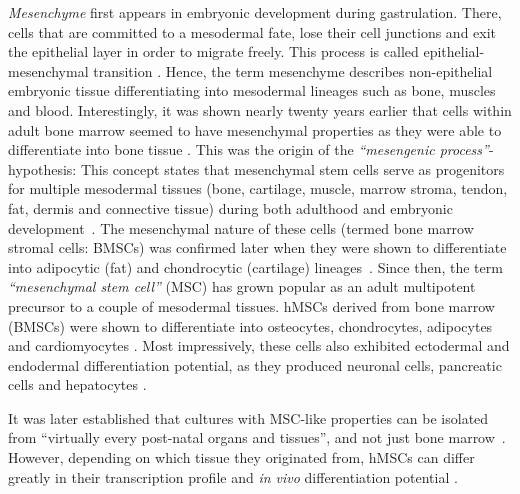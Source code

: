 \emph{Mesenchyme} first appears in embryonic development during gastrulation.
There, cells that are committed to a mesodermal fate, lose their cell junctions
and exit the epithelial layer in order to migrate freely. This process is called
epithelial-mesenchymal transition
\cite{tamFormationMesodermalTissues1987,nowotschinCellularDynamicsEarly2010}.
Hence, the term mesenchyme describes non-epithelial embryonic tissue
differentiating into mesodermal lineages such as bone, muscles and blood.
Interestingly, it was shown nearly twenty years earlier that cells within adult
bone marrow seemed to have mesenchymal properties as they were able to
differentiate into bone tissue
\cite{friedensteinOsteogenesisTransplantsBone1966,
    friedensteinOsteogenicPrecursorCells1971, biancoMesenchymalStemCells2014}. This
was the origin of the \emph{``mesengenic process''}-hypothesis: This concept
states that mesenchymal stem cells serve as progenitors for multiple mesodermal
tissues (bone, cartilage, muscle, marrow stroma, tendon, fat, dermis and
connective tissue) during both adulthood and embryonic
development~\cite{caplanMesenchymalStemCells1991,caplanMesengenicProcess1994}.
The mesenchymal nature of these cells (termed bone marrow stromal cells: BMSCs)
was confirmed later when they were shown to differentiate into adipocytic (fat)
and chondrocytic (cartilage)
lineages~\cite{pittengerMultilineagePotentialAdult1999}. Since then, the term
\emph{``mesenchymal stem cell''} (MSC) has grown popular as an adult multipotent
precursor to a couple of mesodermal tissues. hMSCs derived from bone marrow
(BMSCs) were shown to differentiate into osteocytes, chondrocytes, adipocytes
and cardiomyocytes \cite{gronthosSTRO1FractionAdult1994,
    muruganandanAdipocyteDifferentiationBone2009, xuMesenchymalStemCells2004}. Most
impressively, these cells also exhibited ectodermal and endodermal
differentiation potential, as they produced neuronal cells, pancreatic cells and
hepatocytes \cite{barzilayLentiviralDeliveryLMX1a2009,
    wilkinsHumanBoneMarrowderived2009, gabrInsulinproducingCellsAdult2013,
    stockHumanBoneMarrow2014}.

It was later established that cultures with MSC-like
properties can be isolated from ``virtually every post-natal organs and
tissues'', and not just bone
marrow~\cite{dasilvameirellesMesenchymalStemCells2006}. However, depending on
which tissue they originated from, hMSCs can differ greatly in their
transcription profile and \textit{in vivo} differentiation potential
\cite{jansenFunctionalDifferencesMesenchymal2010,sacchettiNoIdenticalMesenchymal2016}.

